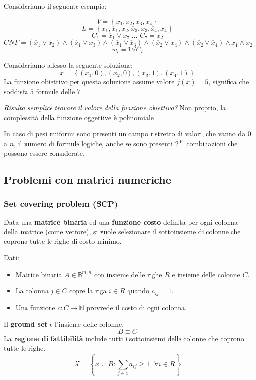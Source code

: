 \documentclass{article}
\begin{document}
Consideriamo il seguente esempio:

$$V=\left\{x_1,x_2,x_3,x_4\right\}$$
$$L=\left\{x_1, \overline{x}_1, x_2, \overline{x}_3, x_3,\overline{x}_4, x_4\right\}$$
$$C_1=\overline{x}_1\lor x_2 \text{ ... } C_7=x_2$$
$$CNF = (\overline{x}_1\lor x_2 )\land (\overline{x}_1\lor x_3 )\land (\overline{x}_1\lor \overline{x}_3 )\land (\overline{x}_2\lor x_4 )\land (\overline{x}_2\lor \overline{x}_4 )\land x_1\land x_2$$
$$w_i=1 \forall C_i$$

Consideriamo adesso la seguente soluzione:
$$x=\left\{(x_1,0),(x_2,0),(x_3,1 ),(x_4,1)\right\}$$
La funzione obiettivo per questa soluzione assume valore $f(x)=5$, significa che soddisfa
$5$ formule delle $7$.

\textit{Risulta semplice trovare il valore della funzione obiettivo?} Non proprio, la complessità
della funzione oggettive è polinomiale

In caso di pesi uniformi sono presenti un campo ristretto di valori, che vanno da $0$ a $n$,
il numero di formule logiche, anche se sono presenti $2^|V|$ combinazioni che possono essere considerate.

\subsection{Problemi con matrici numeriche}
\subsubsection{Set covering problem (SCP)}
Data una \textbf{matrice binaria} ed una \textbf{funzione costo} definita per ogni
colonna della matrice (come vettore), si vuole selezionare il sottoinsieme di
colonne che coprono tutte le righe di costo minimo.

Dati:
\begin{itemize}
    \item Matrice binaria $A\in\mathbb{B}^{m,n}$ con insieme delle righe $R$ e insieme delle colonne $C$.
    \item La colonna $j\in C$ copre la riga $i\in R$ quando $a_{ij}=1$.
    \item Una funzione $c:C\rightarrow\mathbb{N}$ provvede il costo di ogni colonna.
\end{itemize}

Il \textbf{ground set} è l'insieme delle colonne.
$$B\equiv C$$
La \textbf{regione di fattibilità} include tutti i sottoinsiemi delle colonne che coprono
tutte le righe.
$$X=\left\{x\subseteq B : \sum_{j\in x}a_{ij}\geq 1 \text{ }\forall i \in R\right\}$$
\end{document}
